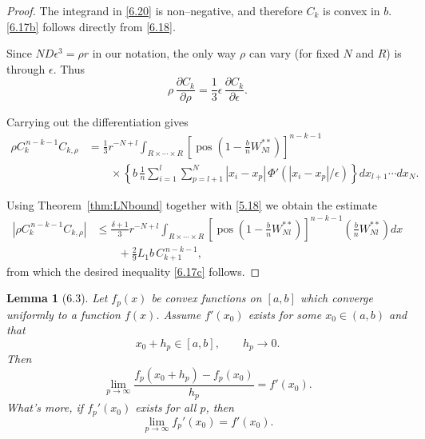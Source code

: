 \documentclass[11pt]{article}
\newtheorem{lemma}{Lemma}
\begin{document}
\begin{proof}
The integrand in \eqref{6.20} is non–negative, and therefore $C_k$ is convex in $b$.
\eqref{6.17b} follows directly from \eqref{6.18}.

Since $ND\epsilon^3=\rho r$ in our notation, the only way $\rho$ can vary
(for fixed $N$ and $R$) is through $\epsilon$. Thus
\[
\rho\,\frac{\partial C_k}{\partial \rho}
=
\frac{1}{3}\epsilon\,\frac{\partial C_k}{\partial \epsilon}.
\]

Carrying out the differentiation gives
\begin{align}
\rho C_k^{\,n-k-1}C_{k,\rho}
&=
\frac{1}{3} r^{-N+l}
\int_{R\times\cdots\times R}
\left[\operatorname{pos}\!\left(1-\frac{b}{n}W_{Nl}^{**}\right)\right]^{n-k-1}
\nonumber\\
&\qquad\times
\left\{
b\,\frac{1}{n}
\sum_{i=1}^{l}\sum_{p=l+1}^{N}
|x_i-x_p|\,\Phi'(|x_i-x_p|/\epsilon)
\right\}
dx_{l+1}\cdots dx_N .
\tag{6.21}\label{6.21}
\end{align}

Using Theorem~\ref{thm:LNbound} together with \eqref{5.18} we obtain the estimate
\begin{align*}
\left|\rho C_k^{\,n-k-1}C_{k,\rho}\right|
&\le
\frac{\delta+1}{3} r^{-N+l}
\int_{R\times\cdots\times R}
\left[\operatorname{pos}\!\left(1-\frac{b}{n}W_{Nl}^{**}\right)\right]^{n-k-1}
\left(\frac{b}{n}W_{Nl}^{**}\right)
dx
\nonumber\\
&\qquad
+
\frac{2}{9} L_1 b\,C_{k+1}^{\,n-k-1},
\end{align*}
from which the desired inequality \eqref{6.17c} follows.
\end{proof}


\begin{lemma}[6.3]\label{lemmaconvex}
    Let $f_p(x)$ be convex functions on $[a,b]$ which converge
uniformly to a function $f(x)$.
Assume $f'(x_0)$ exists for some $x_0\in(a,b)$ and that
\[
x_0+h_p\in[a,b], \qquad h_p\to0 .
\]
Then
\[
\lim_{p\to\infty}
\frac{f_p(x_0+h_p)-f_p(x_0)}{h_p}
=
f'(x_0).
\]
What's more, if $f_p'(x_0)$ exists for all $p$, then
\[
\lim_{p\to\infty}f_p'(x_0)=f'(x_0).
\]
\end{lemma}
\end{document}
